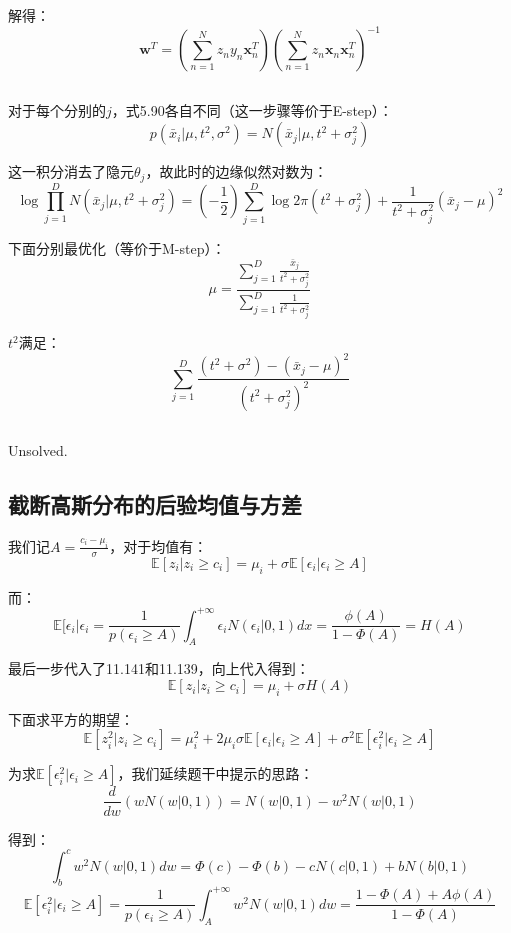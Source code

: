 \documentclass[UTF8]{ctexart}
\begin{document}
解得：
$$\textbf{w}^{T}=(\sum_{n=1}^{N}z_{n}y_{n}\textbf{x}_{n}^{T})(\sum_{n=1}^{N}z_{n}\textbf{x}_{n}\textbf{x}_{n}^{T})^{-1}$$


\subsection{}
对于每个分别的$j$，式5.90各自不同（这一步骤等价于E-step）：
$$p(\bar{x}_{i}|\mu,t^{2},\sigma^{2})=N(\bar{x}_{j}|\mu,t^{2}+\sigma^{2}_{j})$$

这一积分消去了隐元$\theta_{j}$，故此时的边缘似然对数为：
$$\log \prod_{j=1}^{D}N(\bar{x}_{j}|\mu,t^{2}+\sigma^{2}_{j}) = (-\frac{1}{2})\sum_{j=1}^{D}\log 2\pi(t^{2}+\sigma_{j}^{2})+\frac{1}{t^{2}+\sigma_{j}^{2}}(\bar{x}_{j}-\mu)^{2}$$

下面分别最优化（等价于M-step）：
$$\mu=\frac{\sum_{j=1}^{D}\frac{\bar{x}_{j}}{t^{2}+\sigma_{j}^{2}}}{\sum_{j=1}^{D}\frac{1}{t^{2}+\sigma_{j}^{2}}}$$

$t^{2}$满足：
$$\sum_{j=1}^{D}\frac{(t^{2}+\sigma^{2})-(\bar{x}_{j}-\mu)^{2}}{(t^{2}+\sigma_{j}^{2})^{2}}$$

\subsection{}
Unsolved.

\subsection{截断高斯分布的后验均值与方差}
我们记$A=\frac{c_{i}-\mu_{i}}{\sigma}$，对于均值有：
$$\mathbb{E}[z_{i}|z_{i} \geq c_{i}]=\mu_{i}+\sigma \mathbb{E}[\epsilon_{i}|\epsilon_{i} \geq A]$$

而：
$$\mathbb{E}[\epsilon_{i}|\epsilon_{i}=\frac{1}{p(\epsilon_{i} \geq A)}\int_{A}^{+\infty}\epsilon_{i}N(\epsilon_{i}|0,1)dx=\frac{\phi(A)}{1-\Phi(A)}=H(A)$$

最后一步代入了11.141和11.139，向上代入得到：
$$\mathbb{E}[z_{i}|z_{i} \geq c_{i}]=\mu_{i}+\sigma H(A)$$

下面求平方的期望：
$$\mathbb{E}[z_{i}^{2}|z_{i} \geq c_{i}]=\mu_{i}^{2} + 2\mu_{i}\sigma \mathbb{E}[\epsilon_{i}|\epsilon_{i} \geq A] + \sigma^{2}\mathbb{E}[\epsilon_{i}^{2}|\epsilon_{i} \geq A]$$

为求$\mathbb{E}[\epsilon_{i}^{2}|\epsilon_{i} \geq A]$，我们延续题干中提示的思路：
$$\frac{d}{dw}(wN(w|0,1))=N(w|0,1)-w^{2}N(w|0,1)$$

得到：
$$\int_{b}^{c}w^{2}N(w|0,1)dw=\Phi(c)-\Phi(b)-cN(c|0,1)+bN(b|0,1)$$
$$\mathbb{E}[\epsilon_{i}^{2}|\epsilon_{i} \geq A]=\frac{1}{p(\epsilon_{i}\geq A)}\int_{A}^{+\infty}w^{2}N(w|0,1)dw=\frac{1-\Phi(A)+A\phi(A)}{1-\Phi(A)}$$
\end{document}

